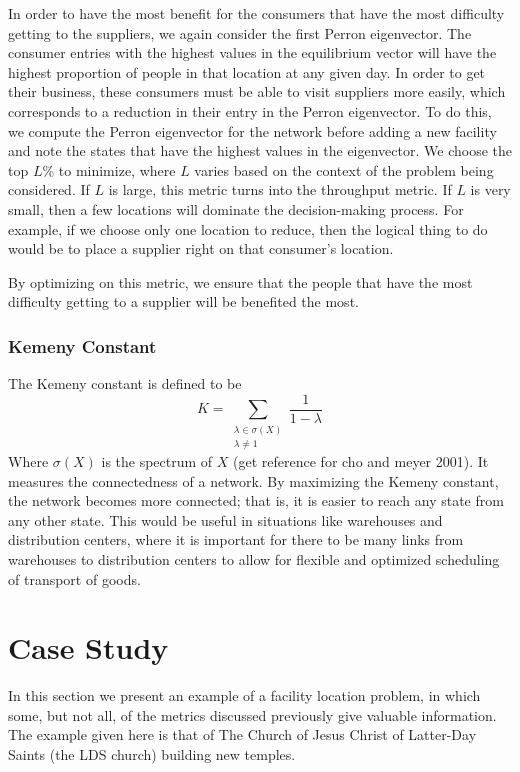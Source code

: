 \documentclass[twoside,twocolumn]{article}
\begin{document}
In order to have the most benefit for the consumers that have the most difficulty getting to the suppliers, we again consider the first Perron eigenvector.
The consumer entries with the highest values in the equilibrium vector will have the highest proportion of people in that location at any given day.
In order to get their business, these consumers must be able to visit suppliers more easily, which corresponds to a reduction in their entry in the Perron eigenvector.
To do this, we compute the Perron eigenvector for the network before adding a new facility and note the states that have the highest values in the eigenvector.
We choose the top $L$\% to minimize, where $L$ varies based on the context of the problem being considered.
If $L$ is large, this metric turns into the throughput metric.
If $L$ is very small, then a few locations will dominate the decision-making process.
For example, if we choose only one location to reduce, then the logical thing to do would be to place a supplier right on that consumer's location.

By optimizing on this metric, we ensure that the people that have the most difficulty getting to a supplier will be benefited the most.

\subsubsection{Kemeny Constant}
The Kemeny constant is defined to be 
$$K = \sum_{\substack{\lambda \in \sigma(X) \\ \lambda \neq 1}} \frac{1}{1-\lambda}$$
Where $\sigma(X)$ is the spectrum of $X$ (get reference for cho and meyer 2001).
It measures the connectedness of a network.
By maximizing the Kemeny constant, the network becomes more connected; that is, it is easier to reach any state from any other state.
This would be useful in situations like warehouses and distribution centers, where it is important for there to be many links from warehouses to distribution centers to allow for flexible and optimized scheduling of transport of goods.

\section{Case Study}

In this section we present an example of a facility location problem, in which some, but not all, of the metrics discussed previously give valuable information. 
The example given here is that of The Church of Jesus Christ of Latter-Day Saints (the LDS church) building new temples.
\end{document}
